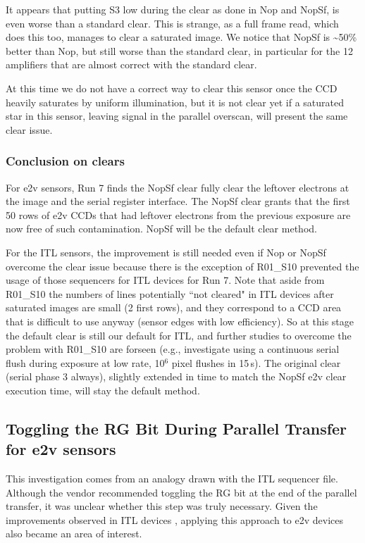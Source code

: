 It appears that putting S3 low during the clear as done in Nop and NopSf,
is even worse than a standard clear. This is strange, as a full frame
read, which does this too, manages to clear a saturated image. We notice
that NopSf is \textasciitilde50\% better than Nop, but still worse than
the standard clear, in particular for the 12 amplifiers that are almost correct
with the standard clear.

At this time we do not have a correct way to clear this
sensor once the CCD heavily saturates by uniform illumination, but it is not
clear yet if a saturated star in this sensor, leaving signal in the
parallel overscan, will present the same clear issue.

\subsubsection{Conclusion on clears}\label{conclusion}
For e2v sensors, Run 7 finds the NopSf clear fully clear the leftover electrons at the image and the serial register interface.
The NopSf clear grants that the first 50 rows of e2v CCDs that had leftover electrons from the previous exposure are now free of such contamination. NopSf will be the default clear method.

For the ITL sensors, the improvement is still needed even if Nop or NopSf overcome the clear issue because there is the exception of R01\_S10 prevented the usage of those sequencers for ITL devices for Run 7. Note that
aside from R01\_S10 the numbers of lines potentially
``not cleared" in ITL devices after saturated images are small (2 first rows), and they
correspond to a CCD area that is difficult to use anyway (sensor edges with low
efficiency). So at this stage the default clear is still our default
for ITL, and further studies to overcome the problem with
R01\_S10 are forseen (e.g., investigate using a continuous
serial flush during exposure at low rate, 10$^6$ pixel flushes in 15\,s).
The original clear (serial phase 3 always), slightly extended in time to match the NopSf e2v clear execution time, will stay the default method.

\subsection{Toggling the RG Bit During Parallel Transfer for e2v sensors}\label{noRGe2v}
This investigation comes from an analogy drawn with the ITL sequencer file. Although the vendor recommended toggling the RG bit at the end of the parallel transfer, it was unclear whether this step was truly necessary. Given the improvements observed in ITL devices \citep{2024SPIE13103E..0WU}, applying this approach to e2v devices also became an area of interest.


